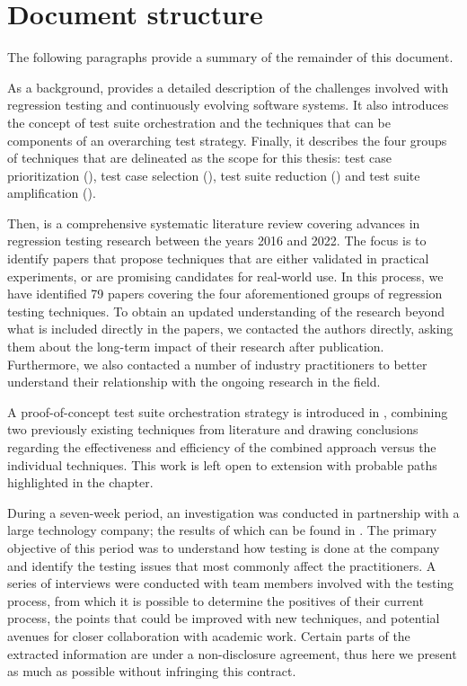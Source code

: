 \section{Document structure}

The following paragraphs provide a summary of the remainder of this document.

As a background,  provides a detailed description of the challenges involved with regression testing and continuously evolving software systems.
It also introduces the concept of test suite orchestration and the techniques that can be components of an overarching test strategy.
Finally, it describes the four groups of techniques that are delineated as the scope for this thesis: test case prioritization (\tcp), test case selection (\tcs), test suite reduction (\tsr) and test suite amplification (\tsa).

Then,  is a comprehensive systematic literature review covering advances in regression testing research between the years 2016 and 2022.
The focus is to identify papers that propose techniques that are either validated in practical experiments, or are promising candidates for real-world use.
In this process, we have identified 79 papers covering the four aforementioned groups of regression testing techniques.
To obtain an updated understanding of the research beyond what is included directly in the papers, we contacted the authors directly, asking them about the long-term impact of their research after publication.
Furthermore, we also contacted a number of industry practitioners to better understand their relationship with the ongoing research in the field.

A proof-of-concept test suite orchestration strategy is introduced in , combining two previously existing techniques from literature and drawing conclusions regarding the effectiveness and efficiency of the combined approach versus the individual techniques.
This work is left open to extension with probable paths highlighted in the chapter.

During a seven-week period, an investigation was conducted in partnership with a large technology company; the results of which can be found in .
The primary objective of this period was to understand how testing is done at the company and identify the testing issues that most commonly affect the practitioners.
A series of interviews were conducted with team members involved with the testing process, from which it is possible to determine the positives of their current process, the points that could be improved with new techniques, and potential avenues for closer collaboration with academic work.
Certain parts of the extracted information are under a non-disclosure agreement, thus here we present as much as possible without infringing this contract.

